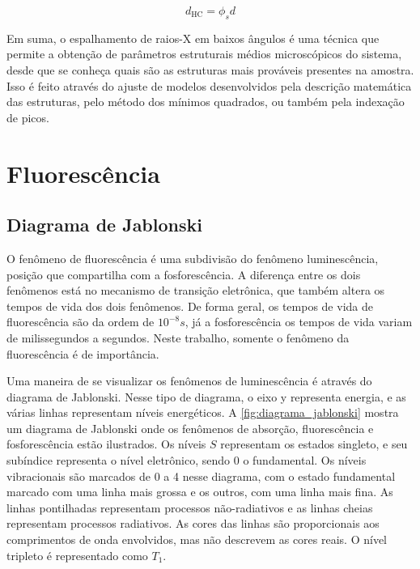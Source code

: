 		\begin{equation} \label{eqn:SAXS_espessura_lamelar} 
			d_{\text{HC}} = \phi_s d
		\end{equation} 
		
		Em suma, o espalhamento de raios-X em baixos ângulos é uma técnica que permite a obtenção de parâmetros estruturais médios microscópicos do sistema, desde que se conheça quais são as estruturas mais prováveis presentes na amostra. Isso é feito através do ajuste de modelos desenvolvidos pela descrição matemática das estruturas, pelo método dos mínimos quadrados, ou também pela indexação de picos.
		
	\chapter{Fluorescência} 
		\section{Diagrama de Jablonski} 
		
		O fenômeno de fluorescência é uma subdivisão do fenômeno luminescência, posição que compartilha com a fosforescência. A diferença entre os dois fenômenos está no mecanismo de transição eletrônica, que também altera os tempos de vida dos dois fenômenos. De forma geral, os tempos de vida de fluorescência são da ordem de \(10^{-8} s\), já a fosforescência os tempos de vida variam de milissegundos a segundos.\cite{Lakowicz2006} Neste trabalho, somente o fenômeno da fluorescência é de importância.
		
		Uma maneira de se visualizar os fenômenos de luminescência é através do diagrama de Jablonski. Nesse tipo de diagrama, o eixo y representa energia, e as várias linhas representam níveis energéticos.\cite{Lakowicz2006} A \autoref{fig:diagrama_jablonski} mostra um diagrama de Jablonski onde os fenômenos de absorção, fluorescência e fosforescência estão ilustrados. Os níveis \(S\) representam os estados singleto, e seu subíndice representa o nível eletrônico, sendo 0 o fundamental. Os níveis vibracionais são marcados de 0 a 4 nesse diagrama, com o estado fundamental marcado com uma linha mais grossa e os outros, com uma linha mais fina. As linhas pontilhadas representam processos não-radiativos e as linhas cheias representam processos radiativos.   As cores das linhas são proporcionais aos comprimentos de onda envolvidos, mas não descrevem as cores reais. O nível tripleto é representado como \(T_1\). 
		

